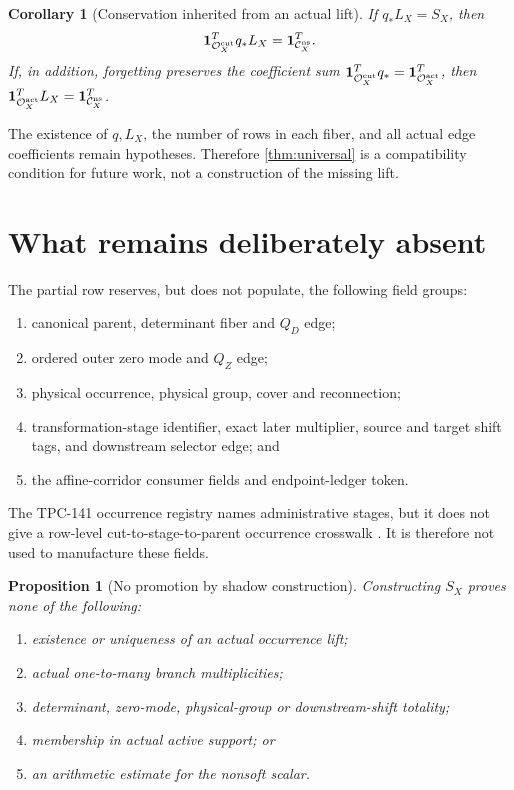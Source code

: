 \documentclass[11pt]{article}
\newtheorem{proposition}[theorem]{Proposition}
\newtheorem{corollary}[theorem]{Corollary}
\theoremstyle{definition}
\theoremstyle{remark}
\newcommand{\Cns}{\mathcal C_X^{\rm ns}}
\newcommand{\Ocut}{\mathcal O_X^{\rm cut}}
\newcommand{\Oact}{\mathcal O_X^{\rm act}}
\newcommand{\one}{\mathbf 1}
\begin{document}
\begin{corollary}[Conservation inherited from an actual lift]
If \(q_*L_X=S_X\), then
\[
 \one_{\Ocut}^{T}q_*L_X=\one_{\Cns}^{T}.
\]
If, in addition, forgetting preserves the coefficient sum
\(\one_{\Ocut}^{T}q_*=\one_{\Oact}^{T}\), then
\(\one_{\Oact}^{T}L_X=\one_{\Cns}^{T}\).
\end{corollary}

The existence of \(q,L_X\), the number of rows in each fiber, and all
actual edge coefficients remain hypotheses.  Therefore
\cref{thm:universal} is a compatibility condition for future work,
not a construction of the missing lift.

\section{What remains deliberately absent}

The partial row reserves, but does not populate, the following field
groups:
\begin{enumerate}[leftmargin=2.2em]
\item canonical parent, determinant fiber and \(Q_D\) edge;
\item ordered outer zero mode and \(Q_Z\) edge;
\item physical occurrence, physical group, cover and reconnection;
\item transformation-stage identifier, exact later multiplier,
source and target shift tags, and downstream selector edge; and
\item the affine-corridor consumer fields and endpoint-ledger token.
\end{enumerate}
The TPC-141 occurrence registry names administrative stages, but it
does not give a row-level cut-to-stage-to-parent occurrence crosswalk
\citep{WangTPC141}.  It is therefore not used to manufacture these
fields.

\begin{proposition}[No promotion by shadow construction]
\label{prop:no-promotion}
Constructing \(S_X\) proves none of the following:
\begin{enumerate}[label=(\alph*),leftmargin=2em]
\item existence or uniqueness of an actual occurrence lift;
\item actual one-to-many branch multiplicities;
\item determinant, zero-mode, physical-group or downstream-shift
totality;
\item membership in actual active support; or
\item an arithmetic estimate for the nonsoft scalar.
\end{enumerate}
\end{proposition}
\end{document}
